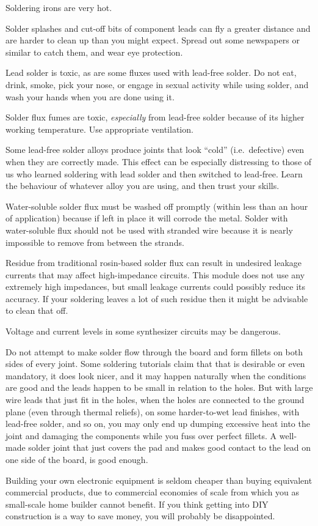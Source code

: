 Soldering irons are very hot.

Solder splashes and cut-off bits of component leads can fly a greater
distance and are harder to clean up than you might expect.  Spread out some
newspapers or similar to catch them, and wear eye protection.

Lead solder is toxic, as are some fluxes used with lead-free solder.  Do not
eat, drink, smoke, pick your nose, or engage in sexual activity while using
solder, and wash your hands when you are done using it.

Solder flux fumes are toxic, \emph{especially} from lead-free solder
because of its higher working temperature.  Use appropriate ventilation.

Some lead-free solder alloys produce joints that look ``cold''
(i.e.\ defective) even when they are correctly made.  This effect can be
especially distressing to those of us who learned soldering with lead solder
and then switched to lead-free.  Learn the behaviour of whatever alloy you  
are using, and then trust your skills.

Water-soluble solder flux must be washed off promptly (within less than an
hour of application) because if left in place it will corrode the metal. 
Solder with water-soluble flux should not be used with stranded wire because
it is nearly impossible to remove from between the strands.

Residue from traditional rosin-based solder flux can result in undesired
leakage currents that may affect high-impedance circuits.  This module does
not use any extremely high impedances, but small leakage currents could
possibly reduce its accuracy.  If your soldering leaves a lot of such
residue then it might be advisable to clean that off.

Voltage and current levels in some synthesizer circuits may be dangerous.

Do not attempt to make solder flow through the board and form fillets on
both sides of every joint.  Some soldering tutorials claim that that is
desirable or even mandatory, it does look nicer, and it may happen naturally
when the conditions are good and the leads happen to be small in relation to
the holes.  But with large wire leads that just fit in the holes, when the
holes are connected to the ground plane (even through thermal reliefs), on
some harder-to-wet lead finishes, with lead-free solder, and so on, you may
only end up dumping excessive heat into the joint and damaging the
components while you fuss over perfect fillets.  A well-made solder joint
that just covers the pad and makes good contact to the lead on one side of
the board, is good enough.

Building your own electronic equipment is seldom cheaper than buying
equivalent commercial products, due to commercial economies of scale from
which you as small-scale home builder cannot benefit.  If you think getting
into DIY construction is a way to save money, you will probably be
disappointed.
